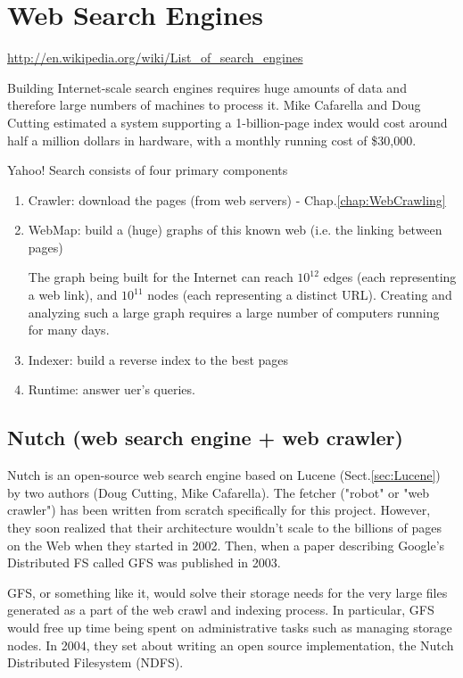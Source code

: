 \chapter{Web Search Engines}
\label{chap:Web_SearchEngines}

\url{http://en.wikipedia.org/wiki/List_of_search_engines}

Building Internet-scale search engines requires huge amounts of data and
therefore large numbers of machines to process it. Mike Cafarella and Doug
Cutting estimated a system supporting a 1-billion-page index would cost around
half a million dollars in hardware, with a monthly running cost of \$30,000.


Yahoo! Search consists of four primary components
\begin{enumerate}
  \item Crawler: download the pages (from web servers) - Chap.\ref{chap:WebCrawling}
  
  \item WebMap: build a (huge) graphs of this known web (i.e. the linking
  between pages)
  
  The graph being built for the Internet can reach $10^{12}$ edges (each
  representing a web link), and $10^{11}$ nodes (each representing a distinct
  URL).  Creating and analyzing such a large graph requires a large number of
  computers running for many days. 
  
  \item Indexer: build a reverse index to the best pages
  \item Runtime: answer uer's queries.
\end{enumerate}

\section{Nutch (web search engine + web crawler)}
\label{sec:Nutch_websearch_engine}

Nutch is an open-source web search engine based on Lucene
(Sect.\ref{sec:Lucene}) by two authors (Doug Cutting, Mike Cafarella).
The fetcher ("robot" or "web crawler") has been written from scratch
specifically for this project. However, they soon realized that their
architecture wouldn't scale to the billions of pages on the Web when they
started in 2002. Then, when a paper describing Google's Distributed FS called
GFS was published in 2003.

GFS, or something like it, would solve their storage needs for the very large
files generated as a part of the web crawl and indexing process. In particular,
GFS would free up time being spent on administrative tasks such as managing
storage nodes. In 2004, they set about writing an open source implementation,
the Nutch Distributed Filesystem (NDFS).   

